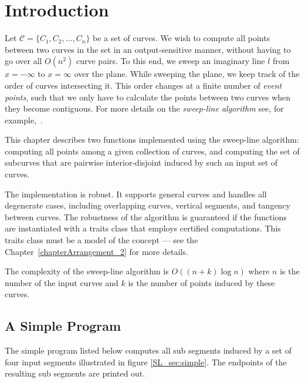 \section{Introduction}

Let ${\mathcal C} = \{C_1, C_2, \ldots, C_n\}$ be a set of curves.
We wish to compute all  points between
two curves in the set in an output-sensitive manner, without having to
go over all $O(n^2)$ curve pairs. To this end, we sweep an imaginary line $l$
from $x = -\infty$ to $x = \infty$ over the plane. While sweeping
the plane, we keep track of the order of curves intersecting it.
This order changes at a finite number of \emph{event points}, such that
we only have to calculate the  points
between two curves when they become contiguous. For more details on the
\emph{sweep-line algorithm} see, for example,~\cite[Chapter~2]{bkos-cgaa-00}.

This chapter describes two functions implemented using the sweep-line
algorithm: computing all  points among a
given collection of curves, and computing the set of subcurves that are
pairwise interior-disjoint induced by such an input set of curves.

The implementation is robust. It supports general
curves and handles all degenerate cases, including overlapping curves,
vertical segments, and tangency between curves. The robustness of the
algorithm is guaranteed if the functions are instantiated with a traits
class that employs certified computations. This traits class must be a model
of the  concept --- see the
Chapter~\ref{chapterArrangement_2} for more details.

The complexity of the sweep-line algorithm is $O((n + k)\log{n})$ where $n$
is the  number of the input curves and $k$ is the number of
 points induced by these curves.

\subsection{A Simple Program}
The simple program listed below computes all sub segments induced by 
a set of four input segments illustrated in figure \ref{SL_sec:simple}.
The endpoints of the resulting sub segments are printed out.

